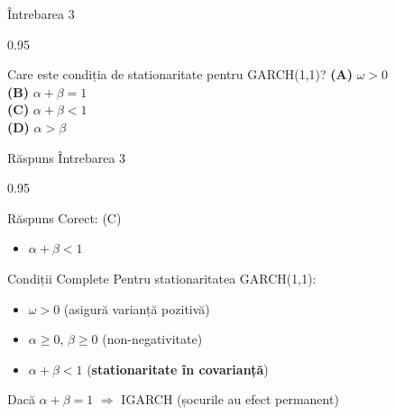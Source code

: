 \documentclass[9pt, aspectratio=169, t]{beamer}
\begin{document}
\begin{frame}{Întrebarea 3}
    \begin{cminipage}{0.95\textwidth}
    \begin{block}{Care este condiția de stationaritate pentru GARCH(1,1)?}
        \textcolor{MainBlue}{\textbf{(A)}} $\omega > 0$\\[3pt]
        \textcolor{MainBlue}{\textbf{(B)}} $\alpha + \beta = 1$\\[3pt]
        \textcolor{MainBlue}{\textbf{(C)}} $\alpha + \beta < 1$\\[3pt]
        \textcolor{MainBlue}{\textbf{(D)}} $\alpha > \beta$
    \end{block}
    \end{cminipage}
\end{frame}

\begin{frame}{Răspuns Întrebarea 3}
    \begin{cminipage}{0.95\textwidth}
    \begin{exampleblock}{Răspuns Corect: (C)}
        \begin{itemize}\setlength{\itemsep}{0pt}
            \item \textbf{$\alpha + \beta < 1$}
        \end{itemize}
    \end{exampleblock}

    \pause
    \begin{block}{Condiții Complete}
        Pentru stationaritatea GARCH(1,1):
        \begin{itemize}\setlength{\itemsep}{0pt}
            \item $\omega > 0$ (asigură varianță pozitivă)
            \item $\alpha \geq 0$, $\beta \geq 0$ (non-negativitate)
            \item $\alpha + \beta < 1$ (\textbf{stationaritate în covarianță})
        \end{itemize}

        \vspace{0.3cm}
        Dacă $\alpha + \beta = 1$ $\Rightarrow$ IGARCH (șocurile au efect permanent)
    \end{block}
    \end{cminipage}
\end{frame}
\end{document}
